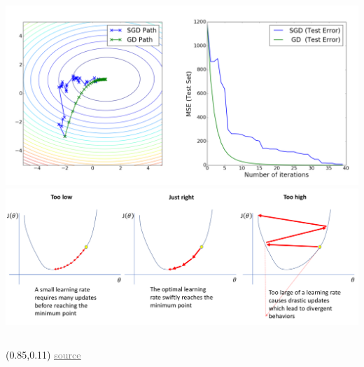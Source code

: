 \documentclass[aspectratio=169,usenames,dvipsnames]{beamer}
\begin{document}
\begin{frame}
\begin{columns}
	\centering
	\includegraphics[width=.9\linewidth]{gd_sgd}
	\includegraphics[width=.9\linewidth]{lr_choice}
\end{columns}

\begin{textblock*}{0.45\paperwidth}(0.85\paperwidth,0.11\paperheight)
	\footnotesize
	\href{https://www.cs.ox.ac.uk/people/varun.kanade/teaching/ML-MT2016/lectures/lecture06.pdf}{\textcolor{gray}{\underline{source}}}
\end{textblock*}

\end{frame}

\end{document}
